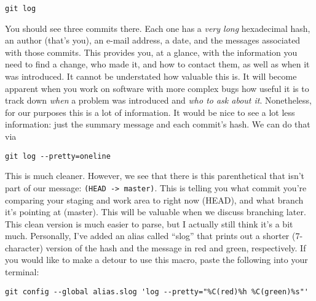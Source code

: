\begin{verbatim}
git log
\end{verbatim}

\par{
You should see three commits there. Each one has a \emph{very long}
hexadecimal hash, an author (that's you), an e-mail address, a date, and the
messages associated with those commits. This provides you, at a glance, with
the information you need to find a change, who made it, and how to contact
them, as well as when it was introduced. It cannot be understated how valuable
this is. It will become apparent when you work on software with more complex
bugs how useful it is to track down \emph{when} a problem was introduced and 
\emph{who to ask about it}. Nonetheless, for our purposes this is a lot of
information. It would be nice to see a lot less information: just the summary
message and each commit's hash. We can do that via
}

\begin{verbatim}
git log --pretty=oneline
\end{verbatim}

\par{
This is much cleaner. However, we see that there is this parenthetical that
isn't part of our message: \verb+(HEAD -> master)+. This is telling you what
commit you're comparing your staging and work area to right now (HEAD), and
what branch it's pointing at (master). This will be valuable when we discuss
branching later. This clean version is much easier to parse, but I actually
still think it's a bit much. Personally, I've added an alias called ``slog''
that prints out a shorter (7-character) version of the hash and the message in
red and green, respectively. If you would like to make a detour to use this
macro, paste the following into your terminal:
}

\begin{verbatim}
git config --global alias.slog 'log --pretty="%C(red)%h %C(green)%s"'
\end{verbatim}

